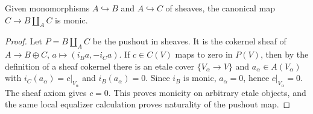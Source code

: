 \begin{lemma}
\label{lemma:weil-pbc-pushout-monicity}
\uses{}
Given monomorphisms $A\hookrightarrow B$ and $A\hookrightarrow C$ of sheaves,
the canonical map $C\to B\amalg_A C$ is monic.
\end{lemma}
\begin{proof}
\uses{} 
Let $P=B\amalg_A C$ be the pushout in sheaves.  It is the cokernel sheaf of
$A\to B\oplus C$, $a\mapsto(i_Ba,-i_Ca)$.  If $c\in C(V)$ maps to zero in
$P(V)$, then by the definition of a sheaf cokernel there is an etale cover
$\{V_\alpha\to V\}$ and $a_\alpha\in A(V_\alpha)$ with
$i_C(a_\alpha)=c|_{V_\alpha}$ and $i_B(a_\alpha)=0$.  Since $i_B$ is monic,
$a_\alpha=0$, hence $c|_{V_\alpha}=0$.  The sheaf axiom gives $c=0$.
This proves monicity on arbitrary etale objects, and the same local
equalizer calculation proves naturality of the pushout map.
\end{proof}

